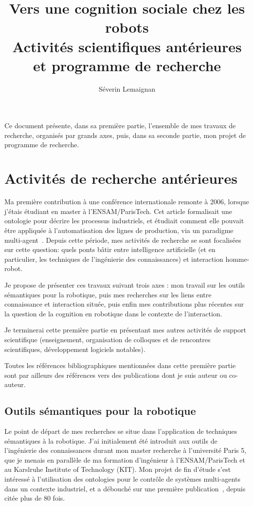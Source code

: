 \documentclass[a4paper]{article}
\title{Vers une cognition sociale chez les robots \\ 
    {\large Activités scientifiques antérieures et programme de recherche}}
\author{Séverin Lemaignan}
\date{}
\begin{document}
\maketitle

Ce document présente, dans sa première partie, l'ensemble de mes travaux de
recherche, organisés par grands axes, puis, dans sa seconde partie, mon projet
de programme de recherche.

\section{Activités de recherche antérieures}
\newrefsection

Ma première contribution à une conférence internationale remonte à 2006, lorsque
j'étais étudiant en master à l'ENSAM/ParisTech. Cet article formalisait une
ontologie pour décrire les processus industriels, et étudiait comment elle
pouvait être appliquée à l'automatisation des lignes de production, via un
paradigme multi-agent~\cite{lemaignan2006mason}. Depuis cette période, mes
activités de recherche se sont focalisées sur cette question: quels ponts bâtir
entre intelligence artificielle (et en particulier, les techniques de
l'ingénierie des connaissances) et interaction homme-robot.

Je propose de présenter ces travaux suivant trois axes : mon travail sur les
outils sémantiques pour la robotique, puis mes recherches sur les liens entre
connaissance et interaction située, puis enfin mes contributions plus récentes
sur la question de la cognition en robotique dans le contexte de l'interaction.

Je terminerai cette première partie en présentant mes autres activités de
support scientifique (enseignement, organisation de colloques et de rencontres
scientifiques, développement logiciels notables).

Toutes les références bibliographiques mentionnées dans cette première partie
sont par ailleurs des références vers des publications dont je suis auteur ou
co-auteur.

\subsection{Outils sémantiques pour la robotique%
  \label{semantic-tools-for-robotics}%
}

Le point de départ de mes recherches se situe dans l'application de techniques
sémantiques à la robotique. J'ai initialement été introduit aux outils de
l'ingénierie des connaissances durant mon master recherche à l'université Paris
5, que je menais en parallèle de ma formation d'ingénieur à l'ENSAM/ParisTech et
au Karslruhe Institute of Technology (KIT). Mon projet de fin d'étude s'est
intéressé à l'utilisation des ontologies pour le contrôle de systèmes
multi-agents dans un contexte industriel, et a débouché sur une première
publication~\cite{lemaignan2006mason}, depuis citée plus de 80 fois.
\end{document}
